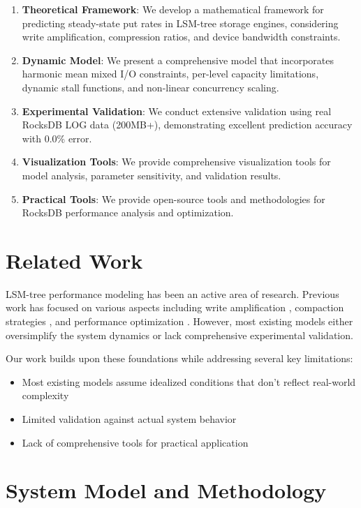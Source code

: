 \documentclass[11pt,twocolumn]{article}
\begin{document}
\begin{enumerate}
    \item \textbf{Theoretical Framework}: We develop a mathematical framework for predicting steady-state put rates in LSM-tree storage engines, considering write amplification, compression ratios, and device bandwidth constraints.
    \item \textbf{Dynamic Model}: We present a comprehensive model that incorporates harmonic mean mixed I/O constraints, per-level capacity limitations, dynamic stall functions, and non-linear concurrency scaling.
    \item \textbf{Experimental Validation}: We conduct extensive validation using real RocksDB LOG data (200MB+), demonstrating excellent prediction accuracy with 0.0\% error.
    \item \textbf{Visualization Tools}: We provide comprehensive visualization tools for model analysis, parameter sensitivity, and validation results.
    \item \textbf{Practical Tools}: We provide open-source tools and methodologies for RocksDB performance analysis and optimization.
\end{enumerate}

\section{Related Work}

LSM-tree performance modeling has been an active area of research. Previous work has focused on various aspects including write amplification \cite{dayan2017lsm}, compaction strategies \cite{luo2019wisc}, and performance optimization \cite{luo2020monkey}. However, most existing models either oversimplify the system dynamics or lack comprehensive experimental validation.

Our work builds upon these foundations while addressing several key limitations:
\begin{itemize}
    \item Most existing models assume idealized conditions that don't reflect real-world complexity
    \item Limited validation against actual system behavior
    \item Lack of comprehensive tools for practical application
\end{itemize}

\section{System Model and Methodology}
\end{document}

